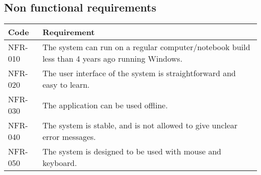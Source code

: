 \subsection{Non functional requirements}
\begin{tabularx}{\textwidth}{|p{2cm}X|}\hline
	Code & Requirement \\\hline
	NFR-010 & The system can run on a regular computer/notebook build less than 4 years ago running Windows.\\\hline
	NFR-020 & The user interface of the system is straightforward and easy to learn.\\\hline
	NFR-030 & The application can be used offline.\\\hline
	NFR-040 & The system is stable, and is not allowed to give unclear error messages.\\\hline
	NFR-050 & The system is designed to be used with mouse and keyboard.\\\hline
\end{tabularx}

